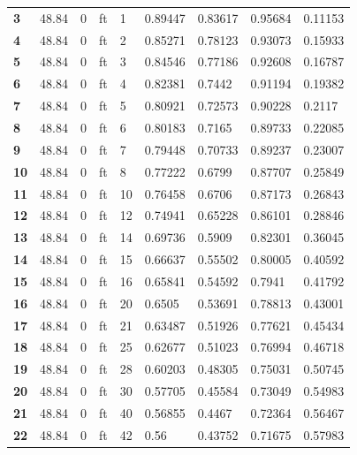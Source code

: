 \documentclass{elegantbook}
\begin{document}
\begin{solution}
\begin{enumerate}[(a)]
\begin{footnotesize}
\begin{longtable}[c]{lllllllll}
                \textbf{3}  & 48.84 & 0 & ft & 1   & 0.89447 & 0.83617 & 0.95684 & 0.11153 \\
                \textbf{4}  & 48.84 & 0 & ft & 2   & 0.85271 & 0.78123 & 0.93073 & 0.15933 \\
                \textbf{5}  & 48.84 & 0 & ft & 3   & 0.84546 & 0.77186 & 0.92608 & 0.16787 \\
                \textbf{6}  & 48.84 & 0 & ft & 4   & 0.82381 & 0.7442  & 0.91194 & 0.19382 \\
                \textbf{7}  & 48.84 & 0 & ft & 5   & 0.80921 & 0.72573 & 0.90228 & 0.2117  \\
                \textbf{8}  & 48.84 & 0 & ft & 6   & 0.80183 & 0.7165  & 0.89733 & 0.22085 \\
                \textbf{9}  & 48.84 & 0 & ft & 7   & 0.79448 & 0.70733 & 0.89237 & 0.23007 \\
                \textbf{10} & 48.84 & 0 & ft & 8   & 0.77222 & 0.6799  & 0.87707 & 0.25849 \\
                \textbf{11} & 48.84 & 0 & ft & 10  & 0.76458 & 0.6706  & 0.87173 & 0.26843 \\
                \textbf{12} & 48.84 & 0 & ft & 12  & 0.74941 & 0.65228 & 0.86101 & 0.28846 \\
                \textbf{13} & 48.84 & 0 & ft & 14  & 0.69736 & 0.5909  & 0.82301 & 0.36045 \\
                \textbf{14} & 48.84 & 0 & ft & 15  & 0.66637 & 0.55502 & 0.80005 & 0.40592 \\
                \textbf{15} & 48.84 & 0 & ft & 16  & 0.65841 & 0.54592 & 0.7941  & 0.41792 \\
                \textbf{16} & 48.84 & 0 & ft & 20  & 0.6505  & 0.53691 & 0.78813 & 0.43001 \\
                \textbf{17} & 48.84 & 0 & ft & 21  & 0.63487 & 0.51926 & 0.77621 & 0.45434 \\
                \textbf{18} & 48.84 & 0 & ft & 25  & 0.62677 & 0.51023 & 0.76994 & 0.46718 \\
                \textbf{19} & 48.84 & 0 & ft & 28  & 0.60203 & 0.48305 & 0.75031 & 0.50745 \\
                \textbf{20} & 48.84 & 0 & ft & 30  & 0.57705 & 0.45584 & 0.73049 & 0.54983 \\
                \textbf{21} & 48.84 & 0 & ft & 40  & 0.56855 & 0.4467  & 0.72364 & 0.56467 \\
                \textbf{22} & 48.84 & 0 & ft & 42  & 0.56    & 0.43752 & 0.71675 & 0.57983 \\

\end{longtable}
\end{footnotesize}
\end{enumerate}
\end{solution}
\end{document}
